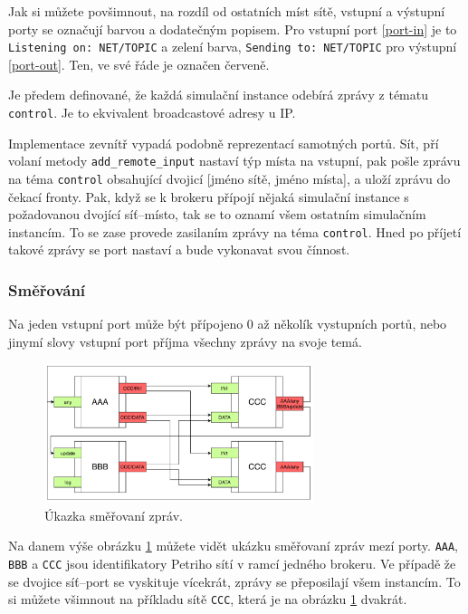 Jak si můžete povšimnout, na rozdíl od ostatních míst sítě, vstupní a výstupní porty se označují barvou a dodatečným popisem. Pro vstupní port \ref{port-in} je to \texttt{Listening on: NET/TOPIC} a zelení barva, \texttt{Sending to: NET/TOPIC} pro výstupní \ref{port-out}. Ten, ve své řáde je označen červeně.

Je předem definované, že každá simulační instance odebírá zprávy z tématu \texttt{control}. Je to ekvivalent broadcastové adresy u IP.

Implementace zevnítř vypadá podobně reprezentací samotných portů. Sít, pří volaní metody \texttt{add\_remote\_input} nastaví týp místa na vstupní, pak pošle zprávu na téma \texttt{control} obsahující dvojicí [jméno sítě, jméno místa], a uloží zprávu do čekací fronty. Pak, když se k brokeru přípojí nějaká simulační instance s požadovanou dvojící síť--místo, tak se to oznamí všem ostatním simulačním instancím. To se zase provede zasilaním zprávy na téma \texttt{control}. Hned po příjetí takové zprávy se port nastaví a bude vykonavat svou čínnost.

\subsubsection{Směřování}
Na jeden vstupní port může být přípojeno 0 až několík vystupních portů, nebo jinymí slovy vstupní port příjma všechny zprávy na svoje temá.

\begin{figure}[htb]
  \begin{center}
    \includegraphics[width=0.7\textwidth]{obrazky-figures/Port-routing.pdf}
    \caption{Úkazka směřovaní zpráv.}
    \label{route-viz}
  \end{center}
\end{figure}

Na danem výše obrázku \ref{route-viz} můžete vidět ukázku směřovaní zpráv mezí porty. \texttt{AAA}, \texttt{BBB} a \texttt{CCC} jsou identifikatory Petriho sítí v ramcí jedného brokeru. Ve případě že se dvojice síť--port se vyskituje vícekrát, zprávy se přeposilají všem instancím. To si můžete všimnout na příkladu sítě \texttt{CCC}, která je na obrázku \ref{route-viz} dvakrát.

